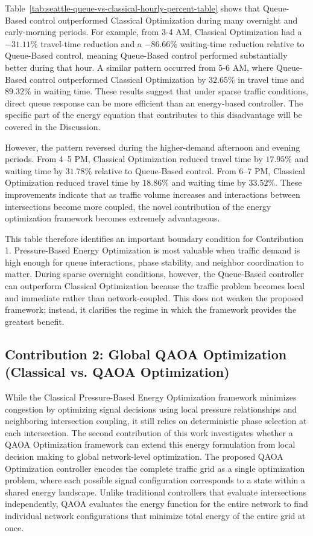 \documentclass[12pt]{article}
\begin{document}
Table~\ref{tab:seattle-queue-vs-classical-hourly-percent-table} shows that Queue-Based control outperformed Classical Optimization during many overnight and early-morning periods. For example, from 3-4 AM, Classical Optimization had a $-31.11\%$ travel-time reduction and a $-86.66\%$ waiting-time reduction relative to Queue-Based control, meaning Queue-Based control performed substantially better during that hour. A similar pattern occurred from 5-6 AM, where Queue-Based control outperformed Classical Optimization by $32.65\%$ in travel time and $89.32\%$ in waiting time. These results suggest that under sparse traffic conditions, direct queue response can be more efficient than an energy-based controller. The specific part of the energy equation that contributes to this disadvantage will be covered in the Discussion.


However, the pattern reversed during the higher-demand afternoon and evening periods. From 4–5 PM, Classical Optimization reduced travel time by $17.95\%$ and waiting time by $31.78\%$ relative to Queue-Based control. From 6–7 PM, Classical Optimization reduced travel time by $18.86\%$ and waiting time by $33.52\%$. These improvements indicate that as traffic volume increases and interactions between intersections become more coupled, the novel contribution of the energy optimization framework becomes extremely advantageous.

This table therefore identifies an important boundary condition for Contribution 1. Pressure-Based Energy Optimization is most valuable when traffic demand is high enough for queue interactions, phase stability, and neighbor coordination to matter. During sparse overnight conditions, however, the Queue-Based controller can outperform Classical Optimization because the traffic problem becomes local and immediate rather than network-coupled. This does not weaken the proposed framework; instead, it clarifies the regime in which the framework provides the greatest benefit.

\subsection{Contribution 2: Global QAOA Optimization (Classical vs. QAOA Optimization)}
\label{sec:qaoa-contribution-results}

While the Classical Pressure-Based Energy Optimization framework minimizes congestion by optimizing signal decisions using local pressure relationships and neighboring intersection coupling, it still relies on deterministic phase selection at each intersection. The second contribution of this work investigates whether a QAOA Optimization framework can extend this energy formulation from local decision making to global network-level optimization. The proposed QAOA Optimization controller encodes the complete traffic grid as a single optimization problem, where each possible signal configuration corresponds to a state within a shared energy landscape. Unlike traditional controllers that evaluate intersections independently, QAOA evaluates the energy function for the entire network to find individual network configurations that minimize total energy of the entire grid at once.
\end{document}
